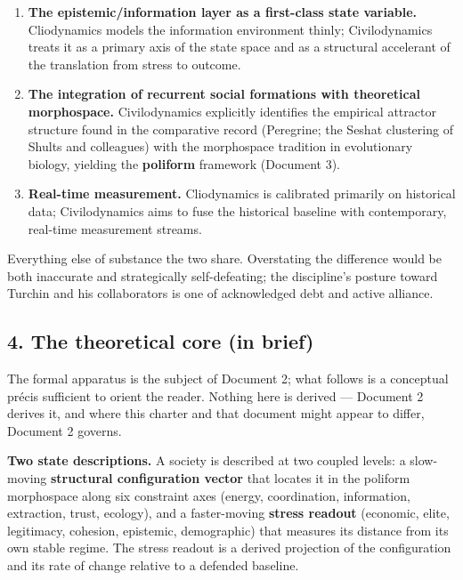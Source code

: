\documentclass[
]{article}
\providecommand{\tightlist}{%
  \setlength{\itemsep}{0pt}\setlength{\parskip}{0pt}}
\begin{document}
\begin{enumerate}
\def\labelenumi{\arabic{enumi}.}
\tightlist
\item
  \textbf{The epistemic/information layer as a first-class state
  variable.} Cliodynamics models the information environment thinly;
  Civilodynamics treats it as a primary axis of the state space and as a
  structural accelerant of the translation from stress to outcome.
\item
  \textbf{The integration of recurrent social formations with
  theoretical morphospace.} Civilodynamics explicitly identifies the
  empirical attractor structure found in the comparative record
  (Peregrine; the Seshat clustering of Shults and colleagues) with the
  morphospace tradition in evolutionary biology, yielding the
  \textbf{poliform} framework (Document 3).
\item
  \textbf{Real-time measurement.} Cliodynamics is calibrated primarily
  on historical data; Civilodynamics aims to fuse the historical
  baseline with contemporary, real-time measurement streams.
\end{enumerate}

Everything else of substance the two share. Overstating the difference
would be both inaccurate and strategically self-defeating; the
discipline's posture toward Turchin and his collaborators is one of
acknowledged debt and active alliance.

\subsection{4. The theoretical core (in
brief)}\label{the-theoretical-core-in-brief}

The formal apparatus is the subject of Document 2; what follows is a
conceptual précis sufficient to orient the reader. Nothing here is
derived --- Document 2 derives it, and where this charter and that
document might appear to differ, Document 2 governs.

\textbf{Two state descriptions.} A society is described at two coupled
levels: a slow-moving \textbf{structural configuration vector} that
locates it in the poliform morphospace along six constraint axes
(energy, coordination, information, extraction, trust, ecology), and a
faster-moving \textbf{stress readout} (economic, elite, legitimacy,
cohesion, epistemic, demographic) that measures its distance from its
own stable regime. The stress readout is a derived projection of the
configuration and its rate of change relative to a defended baseline.
\end{document}
